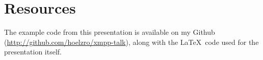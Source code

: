 \appendix
\section{Resources}

The example code from this presentation is available on my Github (\url{http://github.com/hoelzro/xmpp-talk}), along
with the \LaTeX\ code used for the presentation itself.
